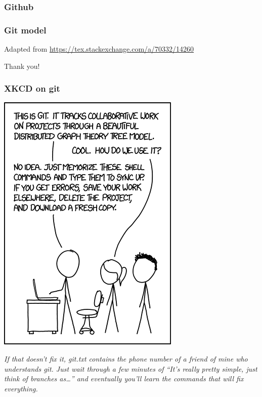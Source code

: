 \documentclass[10pt,svgnames]{beamer}
\begin{document}
\begin{frame}
\frametitle{Github}
\end{frame}

\begin{frame}
\frametitle{Git model}

Adapted from \href{https://tex.stackexchange.com/a/70332/14260}{https://tex.stackexchange.com/a/70332/14260}
\end{frame}






\begin{frame}[standout]
Thank you!
\end{frame}

\appendix

\begin{frame}
\label{xkcd_git}
\frametitle{XKCD on git \hfill\hyperlink{git_cons}{}}

\begin{center}
\includegraphics[height=0.5\paperheight]{figures/xkcd-git.png}
\end{center}

\emph{If that doesn't fix it, git.txt contains the phone number of a friend of mine who understands git.
Just wait through a few minutes of “It's really pretty simple, just think of branches as\ldots” and eventually you'll learn the commands that will fix everything.
}

\end{frame}
\end{document}
